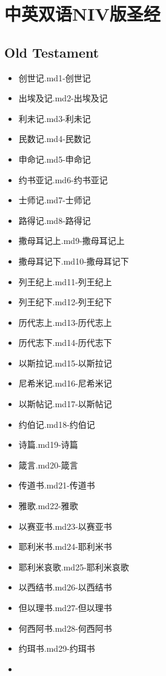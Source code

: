 \documentclass{ctexart}
\begin{document}
\section{中英双语NIV版圣经}\label{header-n0}
\subsection{Old Testament}\label{header-n2}
\begin{itemize}
\item
  {创世记.md}{1-创世记}
\item
  {出埃及记.md}{2-出埃及记}
\item
  {利未记.md}{3-利未记}
\item
  {民数记.md}{4-民数记}
\item
  {申命记.md}{5-申命记}
\item
  {约书亚记.md}{6-约书亚记}
\item
  {士师记.md}{7-士师记}
\item
  {路得记.md}{8-路得记}
\item
  {撒母耳记上.md}{9-撒母耳记上}
\item
  {撒母耳记下.md}{10-撒母耳记下}
\item
  {列王纪上.md}{11-列王纪上}
\item
  {列王纪下.md}{12-列王纪下}
\item
  {历代志上.md}{13-历代志上}
\item
  {历代志下.md}{14-历代志下}
\item
  {以斯拉记.md}{15-以斯拉记}
\item
  {尼希米记.md}{16-尼希米记}
\item
  {以斯帖记.md}{17-以斯帖记}
\item
  {约伯记.md}{18-约伯记}
\item
  {诗篇.md}{19-诗篇}
\item
  {箴言.md}{20-箴言}
\item
  {传道书.md}{21-传道书}
\item
  {雅歌.md}{22-雅歌}
\item
  {以赛亚书.md}{23-以赛亚书}
\item
  {耶利米书.md}{24-耶利米书}
\item
  {耶利米哀歌.md}{25-耶利米哀歌}
\item
  {以西结书.md}{26-以西结书}
\item
  {但以理书.md}{27-但以理书}
\item
  {何西阿书.md}{28-何西阿书}
\item
  {约珥书.md}{29-约珥书}
\item

\end{itemize}
\end{document}
